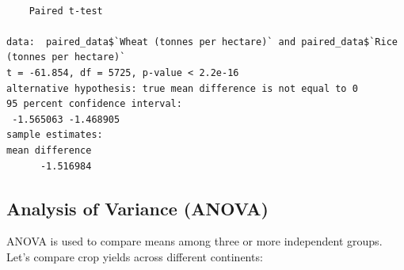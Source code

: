 \documentclass[
  letterpaper,
]{book}
\newenvironment{Shaded}{\begin{snugshade}}{\end{snugshade}}
\newcommand{\AttributeTok}[1]{\textcolor[rgb]{0.40,0.45,0.13}{#1}}
\newcommand{\CommentTok}[1]{\textcolor[rgb]{0.37,0.37,0.37}{#1}}
\newcommand{\ConstantTok}[1]{\textcolor[rgb]{0.56,0.35,0.01}{#1}}
\newcommand{\FunctionTok}[1]{\textcolor[rgb]{0.28,0.35,0.67}{#1}}
\newcommand{\NormalTok}[1]{\textcolor[rgb]{0.00,0.23,0.31}{#1}}
\newcommand{\OtherTok}[1]{\textcolor[rgb]{0.00,0.23,0.31}{#1}}
\newcommand{\SpecialCharTok}[1]{\textcolor[rgb]{0.37,0.37,0.37}{#1}}
\newcommand{\StringTok}[1]{\textcolor[rgb]{0.13,0.47,0.30}{#1}}
\begin{document}
\begin{Shaded}
\end{Shaded}

\begin{verbatim}

    Paired t-test

data:  paired_data$`Wheat (tonnes per hectare)` and paired_data$`Rice (tonnes per hectare)`
t = -61.854, df = 5725, p-value < 2.2e-16
alternative hypothesis: true mean difference is not equal to 0
95 percent confidence interval:
 -1.565063 -1.468905
sample estimates:
mean difference 
      -1.516984 
\end{verbatim}

\subsection{Analysis of Variance
(ANOVA)}\label{analysis-of-variance-anova}

ANOVA is used to compare means among three or more independent groups.
Let's compare crop yields across different continents:
\end{document}
